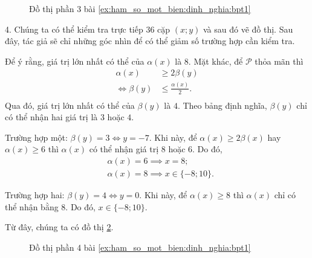 \begin{figure}[H]
   \centering
   \caption{Đồ thị phần 3 bài \ref{ex:ham_so_mot_bien:dinh_nghia:bpt1}}
   \label{fig:ham_so_mot_bien:dinh_nghia:bpt3}
\end{figure}

4. Chúng ta có thể kiểm tra trực tiếp $36$ cặp $(x; y)$ và sau đó vẽ đồ thị. Sau đây, tác giả sẽ chỉ những góc nhìn để có thể giảm số trường hợp cần kiểm tra.

Để ý rằng, giá trị lớn nhất có thể của $\alpha(x)$ là $8$. Mặt khác, để $\mathcal{P}$ thỏa mãn thì
\begin{align*}
   \alpha(x) &\geq 2\beta(y) \\
   \iff \beta(y) &\leq \frac{\alpha(x)}{2}. \\
\end{align*}
Qua đó, giá trị lớn nhất có thể của $\beta(y)$ là $4$. Theo bảng định nghĩa, $\beta(y)$ chỉ có thể nhận hai giá trị là $3$ hoặc $4$. 

\textcolor{colorEmphasisCyan}{Trường hợp một}: $\beta(y) = 3 \iff y = -7$. Khi này, để $\alpha(x) \geq 2\beta(x)$ hay $\alpha(x) \geq 6$ thì $\alpha(x)$ có thể nhận giá trị $8$ hoặc $6$. Do đó,
\begin{align*}
   &\alpha(x) = 6 \implies x = 8;\\
   &\alpha(x) = 8 \implies x \in \{-8; 10\}.
\end{align*}

\textcolor{colorEmphasis}{Trường hợp hai}: $\beta(y) = 4 \iff y = 0$. Khi này, để $\alpha(x) \geq 8$ thì $\alpha(x)$ chỉ có thể nhận bằng $8$. Do đó, $x \in \{-8; 10\}$.

Từ đây, chúng ta có đồ thị \ref{fig:ham_so_mot_bien:dinh_nghia:bpt4}.

\begin{figure}[H]
   \centering
   \caption{Đồ thị phần 4 bài \ref{ex:ham_so_mot_bien:dinh_nghia:bpt1}}
   \label{fig:ham_so_mot_bien:dinh_nghia:bpt4}
\end{figure}

